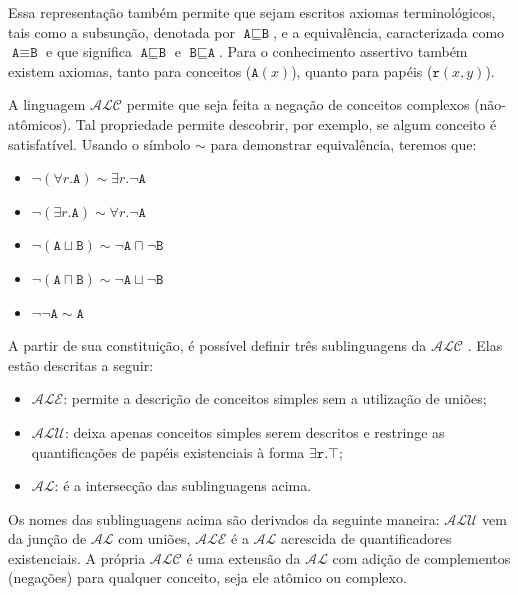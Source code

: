 Essa representação também permite que sejam escritos axiomas terminológicos, tais como a subsunção, denotada por $ \texttt{A} \sqsubseteq \texttt{B} $, e a equivalência, caracterizada como $ \texttt{A} \equiv \texttt{B} $ e que significa $ \texttt{A} \sqsubseteq \texttt{B} $ e $ \texttt{B} \sqsubseteq \texttt{A} $. Para o conhecimento assertivo também existem axiomas, tanto para conceitos ($\texttt{A}(x)$), quanto para papéis ($\texttt{r}(x,y)$).

A linguagem $\mathcal{ALC}$ permite que seja feita a negação de conceitos complexos (não-atômicos). Tal propriedade permite descobrir, por exemplo, se algum conceito é satisfatível. Usando o símbolo $ \sim $ para demonstrar equivalência, teremos que:

\begin{itemize}
	\item $ \neg(\forall r.\texttt{A}) \sim \exists r.\neg \texttt{A}$ 
	\item $ \neg(\exists r.\texttt{A}) \sim \forall r.\neg \texttt{A}$ 
	\item $ \neg(\texttt{A} \sqcup \texttt{B}) \sim \neg \texttt{A} \sqcap \neg \texttt{B}$ 
	\item $ \neg(\texttt{A} \sqcap \texttt{B}) \sim \neg \texttt{A} \sqcup \neg \texttt{B}$ 
	\item $ \neg \neg \texttt{A} \sim \texttt{A} $
\end{itemize}

A partir de sua constituição, é possível definir três sublinguagens da $\mathcal{ALC}$  \citep{logicaSchmidt}. Elas estão descritas a seguir:

\begin{itemize}
	\item $\mathcal{ALE}$: permite a descrição de conceitos simples sem a utilização de uniões; 
	\item $\mathcal{ALU}$: deixa apenas conceitos simples serem descritos e restringe as quantificações de papéis existenciais à forma $ \exists\texttt{r}.\top $;
	\item $\mathcal{AL}$: é a intersecção das sublinguagens acima.
\end{itemize}

Os nomes das sublinguagens acima são derivados da seguinte maneira: $ \mathcal{ALU} $ vem da junção de $ \mathcal{AL} $ com uniões, $ \mathcal{ALE} $ é a $ \mathcal{AL} $ acrescida de quantificadores existenciais. A própria $ \mathcal{ALC} $ é uma extensão da $ \mathcal{AL} $ com adição de complementos (negações) para qualquer conceito, seja ele atômico ou complexo. 

